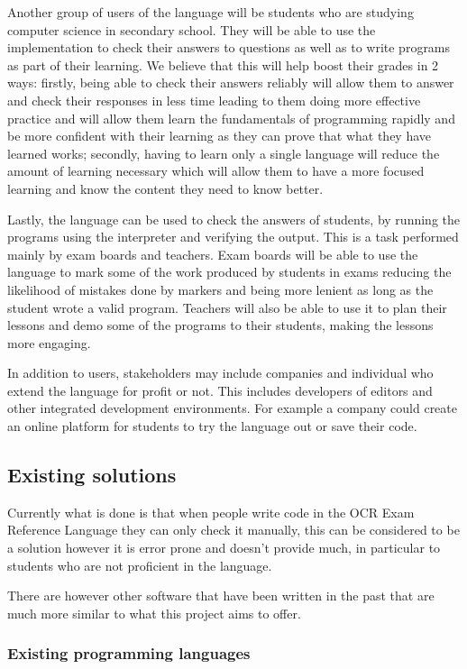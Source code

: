 \documentclass{article}
\begin{document}
Another group of users of the language will be students who are studying
computer science in secondary school. They will be able to use the
implementation to check their answers to questions as well as to write programs
as part of their learning. We believe that this will help boost their grades in
2 ways: firstly, being able to check their answers reliably will allow them to
answer and check their responses in less time leading to them doing more
effective practice and will allow them learn the fundamentals of programming
rapidly and be more confident with their learning as they can prove that what
they have learned works; secondly, having to learn only a single language will
reduce the amount of learning necessary which will allow them to have a more
focused learning and know the content they need to know better.

Lastly, the language can be used to check the answers of students, by running
the programs using the interpreter and verifying the output. This is a task
performed mainly by exam boards and teachers. Exam boards will be able to use
the language to mark some of the work produced by students in exams reducing
the likelihood of mistakes done by markers and being more lenient as long as
the student wrote a valid program. Teachers will also be able to use it to plan
their lessons and demo some of the programs to their students, making the
lessons more engaging.

In addition to users, stakeholders may include companies and individual who
extend the language for profit or not. This includes developers of editors and
other integrated development environments. For example a company could create
an online platform for students to try the language out or save their code.

\subsection{Existing solutions}

Currently what is done is that when people write code in the OCR Exam Reference
Language they can only check it manually, this can be considered to be a
solution however it is error prone and doesn't provide much, in particular to
students who are not proficient in the language.

There are however other software that have been written in the past that are
much more similar to what this project aims to offer.

\subsubsection{Existing programming languages}
\end{document}
